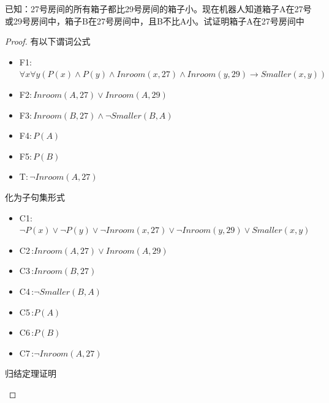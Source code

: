 \begin{example}
    已知：27号房间的所有箱子都比29号房间的箱子小。现在机器人知道箱子A在27号或29号房间中，箱子B在27号房间中，且B不比A小。\textcolor{main1}{试证明箱子A在27号房间中}
    \begin{proof}
        有以下谓词公式
        \begin{itemize}
            \item F1:\,$ \forall x\forall y\left( P(x)\land P(y)\land Inroom(x,27)\land Inroom(y,29)\to Smaller(x,y)  \right) $
            \item F2:\,$ Inroom(A,27)\lor Inroom(A,29) $
            \item F3:\,$ Inroom(B,27)\land \lnot Smaller(B,A) $
            \item F4:\,$P(A)$
            \item F5:\,$P(B)$
            \item T:\,$ \lnot Inroom(A,27) $
        \end{itemize}    
        化为子句集形式
        \begin{itemize}
            \item C1:\,$ \lnot P(x)\lor \lnot P(y)\lor \lnot Inroom(x,27)\lor\lnot Inroom(y,29)\lor Smaller(x,y)  $
            \item C2\,:$ Inroom(A,27)\lor Inroom(A,29) $
            \item C3\,:$ Inroom(B,27) $
            \item C4\,:$ \lnot Smaller(B,A) $
            \item C5\,:$P(A)$
            \item C6\,:$P(B)$
            \item C7\,:$ \lnot Inroom(A,27) $
        \end{itemize}
        \textcolor{main1}{归结定理证明}
        \begin{figure}[htbp]
            \centering

\end{figure}
\end{proof}
\end{example}
